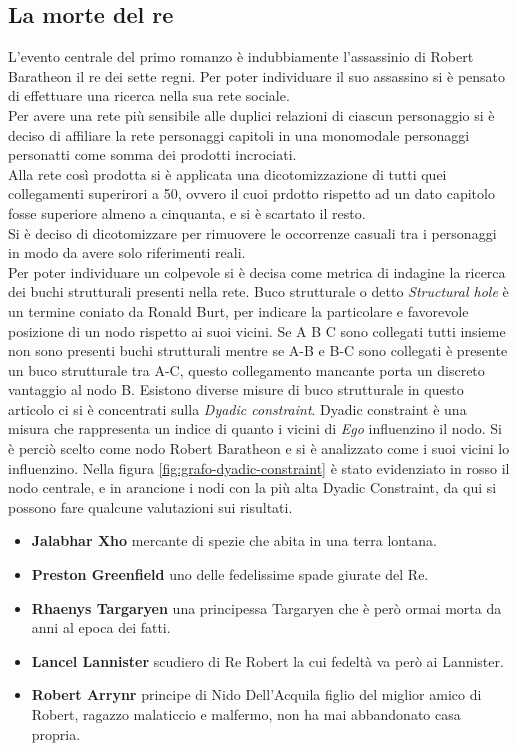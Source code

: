 \documentclass[a4paper]{article}
\begin{document}
\subsection{La morte del re}
L'evento centrale del primo romanzo è indubbiamente l'assassinio di Robert Baratheon il re dei sette regni.
Per poter individuare il suo assassino si è pensato di effettuare una ricerca nella sua rete sociale.\\
Per avere una rete più sensibile alle duplici relazioni di ciascun personaggio si è deciso di affiliare la rete personaggi capitoli in una monomodale personaggi personatti come somma dei prodotti incrociati.\\ 
Alla rete così prodotta si è applicata una dicotomizzazione di tutti quei collegamenti superirori a 50, ovvero il cuoi prdotto rispetto ad un dato capitolo fosse superiore almeno a cinquanta, e si è scartato il resto.\\
Si è deciso di dicotomizzare per rimuovere le occorrenze casuali tra i personaggi in modo da avere solo riferimenti reali.\\
Per poter individuare un colpevole si è decisa come metrica di indagine la ricerca dei buchi strutturali presenti nella rete.
Buco strutturale o detto \textit{Structural hole} è un termine coniato da Ronald Burt, per indicare la particolare e favorevole posizione di un nodo rispetto ai suoi vicini. Se A B C sono collegati tutti insieme non sono presenti buchi strutturali mentre se A-B e B-C sono collegati è presente un buco strutturale tra A-C, questo collegamento mancante porta un discreto vantaggio al nodo B.
Esistono diverse misure di buco strutturale in questo articolo ci si è concentrati sulla \textit{Dyadic constraint}.
Dyadic constraint è una misura che rappresenta un indice di quanto i vicini di \textit{Ego} influenzino il nodo.
Si è perciò scelto come nodo Robert Baratheon e si è analizzato come i suoi vicini lo influenzino.
Nella figura \ref{fig:grafo-dyadic-constraint} è stato evidenziato in rosso il nodo centrale, e in arancione i nodi con la più alta Dyadic Constraint, da qui si possono fare qualcune valutazioni sui risultati.
\begin{itemize}
\item \textbf{Jalabhar Xho} mercante di spezie che abita in una terra lontana.
\item \textbf{Preston Greenfield} uno delle fedelissime spade giurate del Re.
\item \textbf{Rhaenys Targaryen} una principessa Targaryen che è però ormai morta da anni al epoca dei fatti.
\item \textbf{Lancel Lannister} scudiero di Re Robert la cui fedeltà va però ai Lannister.
\item \textbf{Robert Arrynr} principe di Nido Dell'Acquila figlio del miglior amico di Robert, ragazzo malaticcio e malfermo, non ha mai abbandonato casa propria.
\end{itemize}
\end{document}
